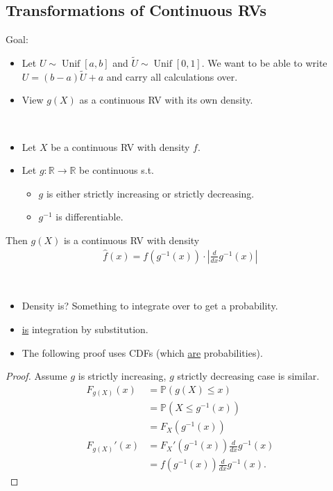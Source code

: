 \subsection{Transformations of Continuous RVs}

Goal: \begin{itemize}
    \item Let $U \sim \operatorname{Unif}[a, b]$ and $\tilde{U} \sim \operatorname{Unif}[0, 1]$. We want to be able to write $U = (b - a) \tilde{U} + a$ and carry all calculations over.
    \item View $g(X)$ as a continuous RV with its own density.
\end{itemize} 

\begin{theorem} \label{theorem:transrv} ~\vspace*{-1.5\baselineskip}
    \begin{itemize}
        \item Let $X$ be a continuous RV with density $f$. 
        \item Let $g: \mathbb{R} \to \mathbb{R}$ be continuous s.t.
        \begin{itemize}
            \item $g$ is either strictly increasing or strictly decreasing.
            \item $g^{-1}$ is differentiable.
        \end{itemize} 
    \end{itemize} 
    Then $g(X)$ is a continuous RV with density
    \begin{align}
        \hat{f}(x) = f(g^{-1}(x)) \cdot \left|\frac{d}{dx} g^{-1}(x)\right| \label{align*:transrv}
    \end{align} 
\end{theorem}

\begin{remark} ~
    \begin{itemize}
        \item Density is? Something to integrate over to get a probability.
        \item {} \underline{is} integration by substitution.
        \item The following proof uses CDFs (which \underline{are} probabilities).
    \end{itemize} 
\end{remark} 

\begin{proof}
    \color{red} Assume $g$ is strictly increasing, $g$ strictly decreasing case is similar. \color{black}
    \begin{align*}
        F_{g(X)}(x) &= \mathbb{P}(g(X) \leq x) \\
        &= \mathbb{P}(X \leq g^{-1}(x)) \\
        &= F_X(g^{-1}(x)) \\
        F_{g(X)}'(x) &= F_X'(g^{-1}(x)) \frac{d}{dx} g^{-1}(x) \\
        &= f(g^{-1}(x)) \frac{d}{dx} g^{-1}(x).
    \end{align*} 
\end{proof}

